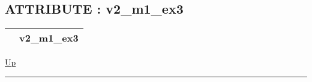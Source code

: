 \subsection*{ATTRIBUTE : v2\_m1\_ex3}
\hypertarget{ecldoc:inintest.example_3.mod_1.v2_m1_ex3}{}

{\renewcommand{\arraystretch}{1.5}
\begin{tabularx}{\textwidth}{|>{\raggedright\arraybackslash}l|X|}
\hline
\hspace{0pt} & v2\_m1\_ex3 \\
\hline
\end{tabularx}
}

\hyperlink{ecldoc:Inintest.Example_3.mod_1}{Up}

\par


\rule{\textwidth}{0.4pt}




